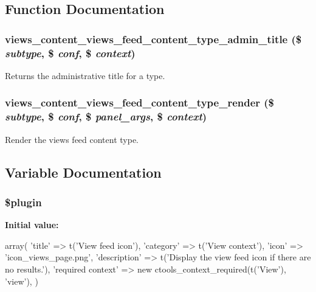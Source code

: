 \subsection{Function Documentation}
\hypertarget{views__feed_8inc_a1bac7a09fef4b18cb154ed4b362541cf}{
\subsubsection[{views\_\-content\_\-views\_\-feed\_\-content\_\-type\_\-admin\_\-title}]{\setlength{\rightskip}{0pt plus 5cm}views\_\-content\_\-views\_\-feed\_\-content\_\-type\_\-admin\_\-title (\$ {\em subtype}, \/  \$ {\em conf}, \/  \$ {\em context})}}
\label{views__feed_8inc_a1bac7a09fef4b18cb154ed4b362541cf}
Returns the administrative title for a type. \hypertarget{views__feed_8inc_ac8b83a5b46a55fd6df3d05f52d11f88c}{
\subsubsection[{views\_\-content\_\-views\_\-feed\_\-content\_\-type\_\-render}]{\setlength{\rightskip}{0pt plus 5cm}views\_\-content\_\-views\_\-feed\_\-content\_\-type\_\-render (\$ {\em subtype}, \/  \$ {\em conf}, \/  \$ {\em panel\_\-args}, \/  \$ {\em context})}}
\label{views__feed_8inc_ac8b83a5b46a55fd6df3d05f52d11f88c}
Render the views feed content type. 

\subsection{Variable Documentation}
\hypertarget{views__feed_8inc_ada8a7130088351710bb02ed622d6bf65}{
\subsubsection[{\$plugin}]{\setlength{\rightskip}{0pt plus 5cm}\$plugin}}
\label{views__feed_8inc_ada8a7130088351710bb02ed622d6bf65}
{\bfseries Initial value:}
\begin{DoxyCode}
 array(
  'title' => t('View feed icon'),
  'category' => t('View context'),
  'icon' => 'icon_views_page.png',
  'description' => t('Display the view feed icon if there are no results.'),
  'required context' => new ctools_context_required(t('View'), 'view'),
)
\end{DoxyCode}
